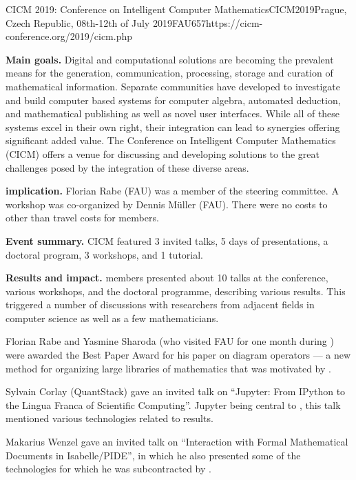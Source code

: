 \begin{event}{CICM 2019: Conference on Intelligent Computer Mathematics}{CICM2019}{Prague, Czech Republic, 08th-12th of July 2019}{FAU}{65}{7}{https://cicm-conference.org/2019/cicm.php}

\textbf{Main goals.}
Digital and computational solutions are becoming the prevalent means for the generation, communication, processing, storage and curation of mathematical information.
Separate communities have developed to investigate and build computer based systems for computer algebra, automated deduction, and mathematical publishing as well as novel user interfaces.
While all of these systems excel in their own right, their integration can lead to synergies offering significant added value.
The Conference on Intelligent Computer Mathematics (CICM) offers a venue for discussing and developing solutions to the great challenges posed by the integration of these diverse areas.

\textbf{\ODK implication.}
Florian Rabe (FAU) was a member of the steering committee.
A workshop was co-organized by Dennis M\"uller (FAU).
There were no costs to \ODK other than travel costs for \ODK members.

\textbf{Event summary.}
CICM featured 3 invited talks, 5 days of presentations, a doctoral program, 3 workshops, and 1 tutorial.

\textbf{Results and impact.}
\ODK members presented about 10 talks at the conference, various workshops, and the doctoral programme, describing various \ODK results.
This triggered a number of discussions with researchers from adjacent fields in computer science as well as a few mathematicians.

Florian Rabe and Yasmine Sharoda (who visited FAU for one month during \ODK) were awarded the Best Paper Award for his paper on diagram operators --- a new method for organizing large libraries of mathematics that was motivated by \ODK.

Sylvain Corlay (QuantStack) gave an invited talk on ``Jupyter: From IPython to the Lingua Franca of Scientific Computing''.
Jupyter being central to \ODK, this talk mentioned various technologies related to \ODK results.

Makarius Wenzel gave an invited talk on ``Interaction with Formal Mathematical Documents in Isabelle/PIDE'', in which he also presented some of the technologies for which he was subcontracted by \ODK.
\end{event}
